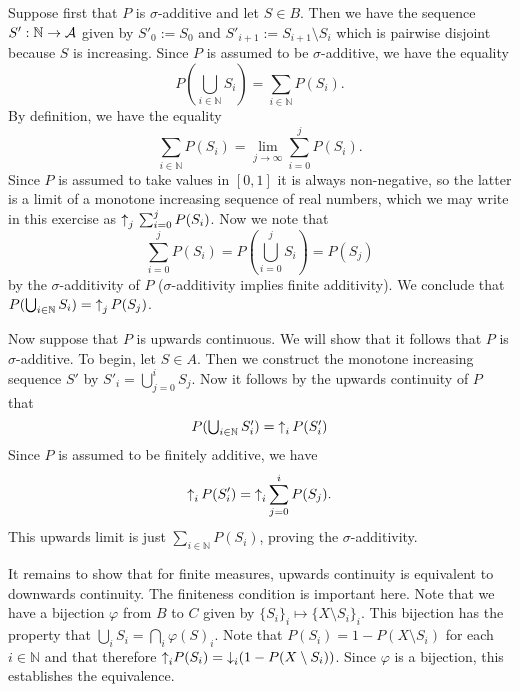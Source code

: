 \documentclass{article}
\begin{document}
\begin{ex}
Suppose first that $P$ is $\sigma$-additive and let $S\in B$. Then we have the sequence $S':\mathbb{N}\to\mathcal{A}$ given by $S'_0:=S_0$ and $S'_{i+1}:=S_{i+1}\setminus S_i$ which is pairwise disjoint because $S$ is increasing. Since $P$ is assumed to be $\sigma$-additive, we have the equality
\begin{equation*}
\textstyle
P(\bigcup_{i\in\mathbb{N}}S_i)=\sum_{i\in\mathbb{N}}P(S_i).
\end{equation*}
By definition, we have the equality
\begin{equation*}
\sum_{i\in\mathbb{N}}P(S_i)=\lim_{j\to\infty}\sum_{i=0}^j P(S_i).
\end{equation*}
Since $P$ is assumed to take values in $[0,1]$ it is always non-negative, so the latter is a limit of a monotone increasing sequence of real numbers, which we may write in this exercise as ${\uparrow}_j\,\sum_{i=0}^j P(S_i)$. Now we note that 
\begin{equation*}
\textstyle
\sum_{i=0}^j P(S_i) = P(\bigcup_{i=0}^j S_i) = P(S_j)
\end{equation*}
by the $\sigma$-additivity of $P$ ($\sigma$-additivity implies finite additivity). We conclude that $P(\bigcup_{i\in\mathbb{N}}S_i)={\uparrow}_{j}\,{P(S_j)}$.

Now suppose that $P$ is upwards continuous. We will show that it follows that $P$ is $\sigma$-additive. To begin, let $S\in A$. Then we construct the monotone increasing sequence $S'$ by $S'_i=\bigcup_{j=0}^i S_j$. Now it follows by the upwards continuity of $P$ that
\begin{equation*}
\textstyle
P(\bigcup_{i\in\mathbb{N}}S'_i)={\uparrow}_{i}\,{P(S'_i)}
\end{equation*}
Since $P$ is assumed to be finitely additive, we have
\begin{equation*}
{\uparrow}_{i}\,P(S'_i)={\uparrow}_{i}\sum_{j=0}^i P(S_j).
\end{equation*}
This upwards limit is just $\sum_{i\in\mathbb{N}}P(S_i)$, proving the $\sigma$-additivity.

It remains to show that for finite measures, upwards continuity is equivalent to
downwards continuity. The finiteness condition is important here. Note that we
have a bijection $\varphi$ from $B$ to $C$ given by $\{S_i\}_i\mapsto\{X\setminus S_i\}_i$.
This bijection has the property that $\bigcup_i S_i=\bigcap_i\varphi(S)_i$. Note that
$P(S_i)=1-P(X\setminus S_i)$ for each $i\in\mathbb{N}$ and that therefore
${\uparrow}_{i}P(S_i)={\downarrow}_{i}(1-P(X\setminus S_i))$. Since $\varphi$ is a bijection,
this establishes the equivalence. 
\end{ex}
\end{document}
